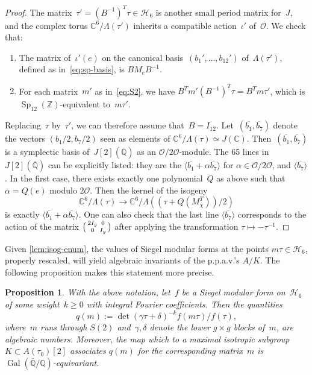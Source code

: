 \documentclass[12pt,oneside]{amsart}
\numberwithin{equation}{section}
\newtheorem{prop}[equation]{Proposition}
\theoremstyle{definition}
\newcommand{\Z}{\mathbb{Z}}
\renewcommand{\O}{\mathcal{O}}
\newcommand{\Q}{\mathbb{Q}}
\newcommand{\Qbar}{\overline{\Q}}
\newcommand{\C}{\mathbb{C}}
\newcommand{\Half}{\mathcal{H}}
\DeclareMathOperator{\Sp}{Sp}
\DeclareMathOperator{\Gal}{Gal}
\DeclarePairedDelimiter{\paren}{(}{)}
\begin{document}
\begin{proof}
  The matrix~$\tau'=(B^{-1})^T\tau\in \Half_6$ is another small period matrix for~$J$,
  and the complex torus $\C^6/\Lambda(\tau')$ inherits a compatible
  action~$\iota'$ of~$\O$. We check that:
  \begin{enumerate}
  \item The matrix of~$\iota'(e)$ on the canonical
    basis~$(b_1',\ldots,b_{12}')$ of~$\Lambda(\tau')$, defined as
    in~\eqref{eq:sp-basis}, is $B M_e B^{-1}$.
  \item For each matrix~$m'$ as in~\eqref{eq:S2}, we have
    $B^{T}m'(B^{-1})^T\tau = B^Tm\tau'$, which is $\Sp_{12}(\Z)$-equivalent
    to~$m\tau'$.
  \end{enumerate}

  Replacing~$\tau$ by~$\tau'$, we can therefore assume
  that~$B=I_{12}$. Let~$(\overline{b_1},\overline{b_7})$ denote the vectors
  $(b_1/2,b_7/2)$ seen as elements of $\C^6/\Lambda(\tau) \simeq J(\C)$.
  Then~$(\overline{b_1},\overline{b_7})$ is a symplectic basis of~$J[2](\Qbar)$
  as an $\O/2\O$-module. The 65 lines in~$J[2](\Qbar)$ can be explicitly
  listed: they are the $\langle \overline{b_1} + \alpha \overline{b_7} \rangle$
  for $\alpha\in \O/2\O$, and $\langle \overline{b_7} \rangle$. In the first
  case, there exists exactly one polynomial~$Q$ as above such
  that~$\alpha = Q(e)$ modulo $2\O$. Then the kernel of the isogeny
  \begin{displaymath}
    \C^6/\Lambda(\tau) \to \C^6/ \Lambda((\tau + Q(M_\chi^T))/2)
  \end{displaymath}
  is exactly $\langle \overline{b_1} + \alpha \overline{b_7} \rangle$. One can
  also check that the last line $\langle \overline{b_7} \rangle$ corresponds to
  the action of the matrix $
  \paren[\big]{\begin{smallmatrix}
    2 I_g & 0\\ 0 & I_g
  \end{smallmatrix}}$ after applying the transformation $\tau\mapsto -\tau^{-1}$.
\end{proof}

Given \cref{lem:isog-enum}, the values of Siegel modular forms at the points
$m\tau\in \Half_6$, properly rescaled, will yield algebraic invariants of the
p.p.a.v.'s $A/K$. The following proposition makes this statement more precise.


\begin{prop}
  \label{prop:alg-invariants}
  With the above notation, let~$f$ be a Siegel modular form on~$\Half_6$ of
  some weight~$k\geq 0$ with integral Fourier coefficients. Then the quantities
  \begin{displaymath}
    q(m):=\det(\gamma\tau+\delta)^{-k} f(m\tau)/f(\tau),
  \end{displaymath}
  where~$m$ runs through $S(2)$ and~$\gamma,\delta$ denote the lower
  $g\times g$ blocks of~$m$, are algebraic numbers. Moreover, the map which to
  a maximal isotropic subgroup $K\subset A(\tau_0)[2]$ associates $q(m)$ for
  the corresponding matrix~$m$ is $\Gal(\Qbar/\Q)$-equivariant.
\end{prop}
\end{document}
